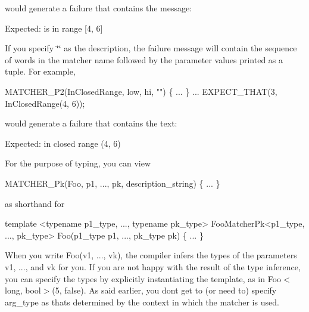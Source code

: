 

would generate a failure that contains the message\+:


\begin{DoxyCode}
Expected: is in range [4, 6]
\end{DoxyCode}


If you specify {\ttfamily \char`\"{}\char`\"{}} as the description, the failure message will contain the sequence of words in the matcher name followed by the parameter values printed as a tuple. For example,


\begin{DoxyCode}
MATCHER\_P2(InClosedRange, low, hi, \textcolor{stringliteral}{""}) \{ ... \}
...
EXPECT\_THAT(3, InClosedRange(4, 6));
\end{DoxyCode}


would generate a failure that contains the text\+:


\begin{DoxyCode}
Expected: in closed range (4, 6)
\end{DoxyCode}


For the purpose of typing, you can view


\begin{DoxyCode}
MATCHER\_Pk(Foo, p1, ..., pk, description\_string) \{ ... \}
\end{DoxyCode}


as shorthand for


\begin{DoxyCode}
\textcolor{keyword}{template} <\textcolor{keyword}{typename} p1\_type, ..., \textcolor{keyword}{typename} pk\_type>
FooMatcherPk<p1\_type, ..., pk\_type>
Foo(p1\_type p1, ..., pk\_type pk) \{ ... \}
\end{DoxyCode}


When you write {\ttfamily Foo(v1, ..., vk)}, the compiler infers the types of the parameters {\ttfamily v1}, ..., and {\ttfamily vk} for you. If you are not happy with the result of the type inference, you can specify the types by explicitly instantiating the template, as in {\ttfamily Foo$<$long, bool$>$(5, false)}. As said earlier, you don\textquotesingle{}t get to (or need to) specify {\ttfamily arg\+\_\+type} as that\textquotesingle{}s determined by the context in which the matcher is used.

